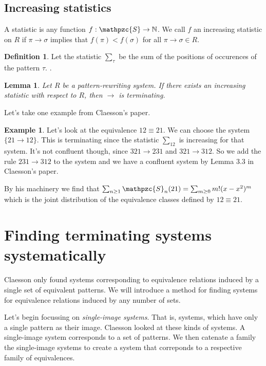 \documentclass[a4paper, 11pt]{article}
\newtheorem{lemma}[theorem]{Lemma}
\theoremstyle{definition}
\newtheorem{definition}[theorem]{Definition}
\newtheorem{example}[theorem]{Example}
\newcommand{\Sym}{\mathpzc{S}}
\begin{document}
\subsection{Increasing statistics}
A statistic is any function $f : \Sym \to \mathbb{N}$. We call $f$ an increasing
statistic on $R$ if $\pi \to \sigma$ implies that $f(\pi) < f(\sigma)$ for all
$\pi \to \sigma \in R$.

\begin{definition}
    Let the statistic $\sum_\tau$ be the sum of the positions of occurences of
    the pattern $\tau$. 
    \cite{claesson}.
\end{definition}

\begin{lemma}
    Let $R$ be a pattern-rewriting system. If there exists an increasing
    statistic with respect to $R$, then $\to$ is terminating.    
\end{lemma}

Let's take one example from Claesson's paper.
\begin{example}
    Let's look at the equivalence $12 \equiv 21$. We can choose the system 
    $\{ 21 \to 12 \}$. This is terminating since the statistic $\sum_{12}$ is
    increasing for that system. It's not confluent though, since $321 \to 231$
    and $321 \to 312$. So we add the rule $231 \to 312$ to the system and we
    have a confluent system by Lemma 3.3 in Claesson's paper. 

    By his machinery we find that $\sum_{n \geq 1} \Sym_n(21) = \sum_{m \geq 0}
    m!(x-x^2)^m$ which is the joint distribution of the equivalence classes
    defined by $12 \equiv 21$.
\end{example}

\section{Finding terminating systems systematically}
Claesson only found systems corresponding to equivalence relations induced by a
single set of equivalent patterns. We will introduce a method for finding
systems for equivalence relations induced by any number of sets.

Let's begin focussing on \emph{single-image systems}. That is, systems, which
have only a single pattern as their image. Claesson looked at these kinds
of systems. A single-image system corresponds to a set of patterns.
We then catenate a family the single-image systems to
create a system that correponds to a respective family of equivalences.
\end{document}
